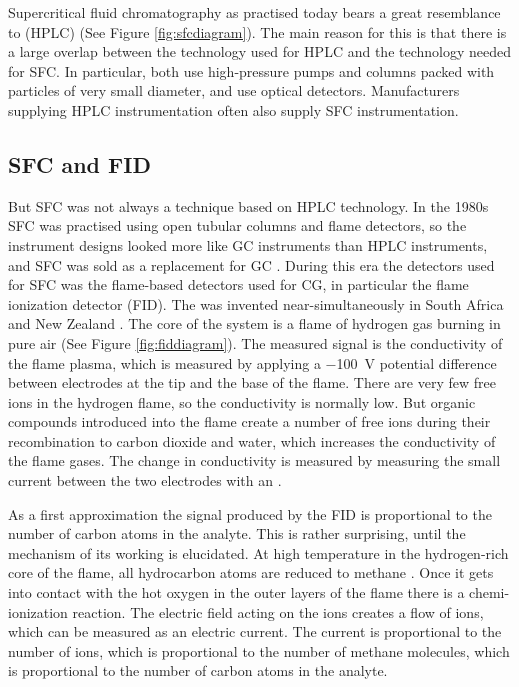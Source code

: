 Supercritical fluid chromatography as practised today bears a great resemblance
to  (HPLC) (See Figure
\ref{fig:sfcdiagram}). The main reason for this is that there is a large overlap
between the technology used for HPLC and the technology needed for SFC. In
particular, both use high-pressure pumps and columns packed with particles of
very small diameter, and use optical detectors. Manufacturers supplying HPLC
instrumentation often also supply SFC instrumentation.

\subsection{SFC and FID}

But SFC was not always a technique based on HPLC technology. In the 1980s SFC
was practised using open tubular columns and flame detectors, so the instrument
designs looked more like GC instruments than HPLC instruments, and SFC was sold
as a replacement for GC \autocite{Poole2003}. During this era the detectors used
for SFC was the flame-based detectors used for CG, in particular the flame
ionization detector (FID). The  was invented
near-simultaneously in South Africa and New Zealand \autocite{Ettre2008}. The
core of the system is a flame of hydrogen gas burning in pure air (See Figure
\ref{fig:fiddiagram}). The measured signal is the conductivity of the flame
plasma, which is measured by applying a \SI{-100}{\volt} potential difference
between electrodes at the tip and the base of the flame. There are very few free
ions in the hydrogen flame, so the conductivity is normally low. But organic
compounds introduced into the flame create a number of free ions during their
recombination to carbon dioxide and water, which increases the conductivity of
the flame gases. The change in conductivity is measured by measuring the small
current between the two electrodes with an .

As a first approximation the signal produced by the FID is proportional to the
number of carbon atoms in the analyte. This is rather surprising, until the
mechanism of its working is elucidated. At high temperature in the hydrogen-rich
core of the flame, all hydrocarbon atoms are reduced to methane
\autocite{Holm1996}. Once it gets into contact with the hot oxygen in the outer
layers of the flame there is a chemi-ionization reaction. The electric field
acting on the ions creates a flow of ions, which can be measured as an electric
current. The current is proportional to the number of ions, which is
proportional to the number of methane molecules, which is proportional to the
number of carbon atoms in the analyte.

